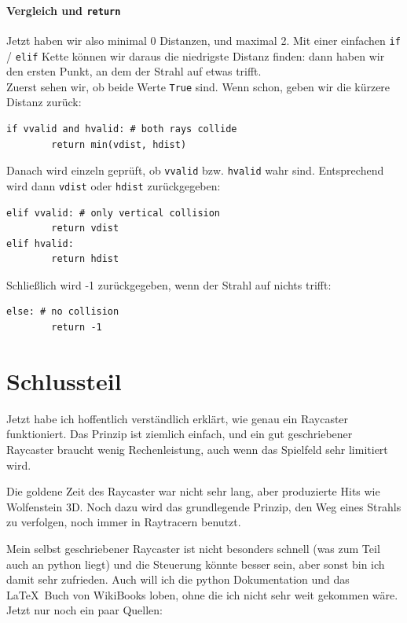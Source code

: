 \documentclass[a4paper,12pt]{report}
\newcommand{\mychapter}[2]{
    \setcounter{chapter}{#1}
    \setcounter{section}{0}
    \chapter*{#2}
    \addcontentsline{toc}{chapter}{#2}
}
\begin{document}
\subsubsection{Vergleich und \texttt{return}}
Jetzt haben wir also minimal 0 Distanzen, und maximal 2. Mit einer einfachen \texttt{if} / \texttt{elif} Kette k\"onnen wir daraus die niedrigste Distanz finden: dann haben wir den ersten Punkt, an dem der Strahl auf etwas trifft. \\
Zuerst sehen wir, ob beide Werte \texttt{True} sind. Wenn schon, geben wir die k\"urzere Distanz zur\"uck:
\begin{Verbatim}[baselinestretch=1.0, xleftmargin=1cm]
if vvalid and hvalid: # both rays collide
        return min(vdist, hdist)
\end{Verbatim}
Danach wird einzeln gepr\"uft, ob \texttt{vvalid} bzw. \texttt{hvalid} wahr sind. Entsprechend wird dann \texttt{vdist} oder \texttt{hdist} zur\"uckgegeben:
\begin{Verbatim}[baselinestretch=1.0, xleftmargin=1cm]
elif vvalid: # only vertical collision
        return vdist
elif hvalid:
        return hdist
\end{Verbatim}
Schlie\ss lich wird -1 zur\"uckgegeben, wenn der Strahl auf nichts trifft:
\begin{Verbatim}[baselinestretch=1.0, xleftmargin=1cm]
else: # no collision
        return -1
\end{Verbatim}

\begingroup
\renewcommand{\cleardoublepage}{}
\renewcommand{\clearpage}{}

\mychapter{3}{Schlussteil}
Jetzt habe ich hoffentlich verst\"andlich erkl\"art, wie genau ein Raycaster funktioniert. Das Prinzip ist ziemlich einfach, und ein gut geschriebener Raycaster braucht wenig Rechenleistung, auch wenn das Spielfeld sehr limitiert wird.

Die goldene Zeit des Raycaster war nicht sehr lang, aber produzierte Hits wie Wolfenstein 3D. Noch dazu wird das grundlegende Prinzip, den Weg eines Strahls zu verfolgen, noch immer in Raytracern benutzt.

Mein selbst geschriebener Raycaster ist nicht besonders schnell (was zum Teil auch an python liegt) und die Steuerung k\"onnte besser sein, aber sonst bin ich damit sehr zufrieden. Auch will ich die python Dokumentation und das \LaTeX\ Buch von WikiBooks loben, ohne die ich nicht sehr weit gekommen w\"are. Jetzt nur noch ein paar Quellen:
\endgroup
\end{document}
